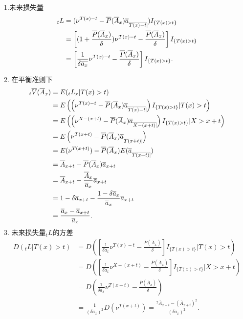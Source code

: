\documentclass[a4paper,openany, 10pt]{ctexbook}
\makeatletter
\def\z{\left}
\def\y{\right}
\DeclareRobustCommand{\annu}[1]{_{%
    \def\arraystretch{0}%
    \setlength\arraycolsep{1pt}%
    \setlength\arrayrulewidth{.2pt}%
    \begin{array}[b]{@{}c|}\hline
        \\[\arraycolsep]%
        \scriptstyle #1%
    \end{array}%
}}
\makeatother
\begin{document}
1.未来损失量
\begin{align*}
    {}_tL&=(\nu^{T(x)-t}-\overline{P}( \overline{A}_x )\overline a_{\annu {T(x)-t}})I_{\{T(x)>t\}} \\
                        &=\z[(1+\frac{\overline{P}( \overline{A}_x )}{\delta})\nu^{T(x)-t}-\frac{\overline{P}( \overline{A}_x )}{\delta}\y] I_{\{T(x)>t\}}\\
                        &=\z[\frac{1}{\delta\overline{a_x}}\nu^{T(x)-t}-\frac{\overline{P}( \overline{A}_x )}{\delta}\y]I_{\{T(x)>t\}}.
\end{align*}

2. 在平衡准则下
\begin{align*}
    {}_t\overline V(\overline A_x)&=E({}_tL_x|T(x)>t) \\
                        &=E\z(\z(\nu^{T(x)-t}-\overline{P}( \overline{A}_x )\overline a_{\annu {T(x)-t}}\y)I_{\{T(x)>t\}}|T(x)>t\y)\\
                        &=E\z(\z(\nu^{X-(x+t)}-\overline{P}( \overline{A}_x )\overline a_{\annu {X-(x+t)}}\y)I_{\{T(x)>t\}}|X>x+t\y)\\
                        &=E\z(\nu^{T(x+t)}-\overline{P}( \overline{A}_x )\overline a_{\annu {T(x+t)}}\y)\\
                        &=E(\nu^{T(x+t)})-\overline{P}( \overline{A}_x )E(\overline a_{\annu {T(x+t)}})\\
                        &=\overline A_{x+t}-\overline{P}( \overline{A}_x )\overline a_{x+t}\\
                        &=\overline A_{x+t}-\frac{\overline A_x}{\overline a_x}\overline a_{x+t}\\
                        &=1-\delta\overline a_{x+t}-\frac{1-\delta \overline a_x}{\overline a_x}\overline a_{x+t}\\
                        &=\frac{\overline a_x-\overline a_{x+t}}{\overline a_x}.
\end{align*}
3. 未来损失量$_tL$的方差
\begin{align*}
    D(_tL|T(x)>t) &=D\z(\z[\frac{1}{\delta\overline{a}_x}\nu^{T(x)-t}-\frac{\overline{P}( \overline{A}_x )}{\delta}\y]I_{\{T(x)>t\}}|T(x)>t\y)\\
                        &=D\z(\z[\frac{1}{\delta\overline{a}_x}\nu^{X-(x+t)}-\frac{\overline{P}( \overline{A}_x )}{\delta}\y]I_{\{T(x)>t\}}|X>x+t\y)\\
                        &=D\z(\frac{1}{\delta\overline{a}_x}\nu^{T(x+t)}-\frac{\overline{P}( \overline{A}_x )}{\delta}\y)\\
                        &=\frac{1}{(\delta\overline a_x)^2}D(\nu^{T(x+t)})=\frac{^2\overline A_{x+t}-(\overline A_{x+t})^2}{(\delta\overline a_x)^2}.                 \end{align*}
\end{document}
